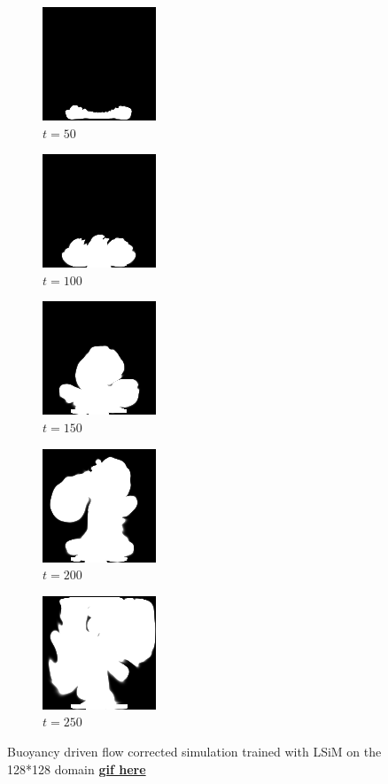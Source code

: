 \documentclass[a4paper,12pt,twoside]{report}
\begin{document}
\begin{figure}
	\centering
	\begin{subfigure}{0.18\textwidth}
		\centering
		\includegraphics[scale=0.56]{buoyancy_test/dens_000050_lsim.png}
		\caption{$t=50$}
	\end{subfigure}
	\begin{subfigure}{0.18\textwidth}
		\centering
		\includegraphics[scale=0.56]{buoyancy_test/dens_000100_lsim.png}
		\caption{$t=100$}
	\end{subfigure}
	\begin{subfigure}{0.18\textwidth}
		\centering
		\includegraphics[scale=0.56]{buoyancy_test/dens_000150_lsim.png}
		\caption{$t=150$}
	\end{subfigure}
	\begin{subfigure}{0.18\textwidth}
		\centering
		\includegraphics[scale=0.56]{buoyancy_test/dens_000200_lsim.png}
		\caption{$t=200$}
	\end{subfigure}
	\begin{subfigure}{0.18\textwidth}
		\centering
		\includegraphics[scale=0.56]{buoyancy_test/dens_000249_lsim.png}
		\caption{$t=250$}
	\end{subfigure}
	\caption{Buoyancy driven flow corrected simulation trained with LSiM on the 128*128 domain \href{https://github.com/w191444052/sol-data/blob/master/buoyancy_high/lsim.gif}{\bf{gif here}}}
	\label{sol buoyancy high lsim}
\end{figure}
\end{document}
